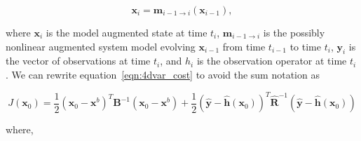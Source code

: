 \begin{equation}
\textbf{x}_{i} = \textbf{m}_{i-1 \rightarrow i}(\textbf{x}_{i-1}), \label{eqn:nonlinmod}
\end{equation}

where \(\textbf{x}_{i}\) is the model augmented state at time \(t_i\), \(\textbf{m}_{i-1 \rightarrow i}\) is the possibly nonlinear augmented system model evolving \(\textbf{x}_{i-1}\) from time \(t_{i-1}\) to time \(t_i\), \(\textbf{y}_i\) is the vector of observations at time \(t_i\), and \(h_i\) is the observation operator at time \(t_i\). We can rewrite equation~\eqref{eqn:4dvar_cost} to avoid the sum notation as

\begin{equation}
J(\textbf{x}_0) = \frac{1}{2}(\textbf{x}_0-\textbf{x}^b)^{T}\textbf{B}^{-1}(\textbf{x}_0-\textbf{x}^b)+\frac{1}{2}(\hat{\textbf{y}}-\hat{\textbf{h}}(\textbf{x}_0))^{T}\hat{\textbf{R}}^{-1}(\hat{\textbf{y}}-\hat{\textbf{h}}(\textbf{x}_0)) \label{costfn}
\end{equation}


where,

